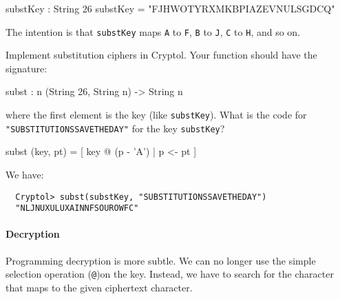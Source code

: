 \begin{code}
  substKey : String 26
  substKey = "FJHWOTYRXMKBPIAZEVNULSGDCQ"
\end{code}
The intention is that {\tt substKey} maps {\tt A} to {\tt F}, {\tt B}
to {\tt J}, {\tt C} to {\tt H}, and so on.

\begin{Exercise}\label{ex:subst:0}
  Implement substitution ciphers in Cryptol. Your function should have
  the signature:
\begin{code}
  subst : {n} (String 26, String n) -> String n
\end{code}
where the first element is the key (like {\tt substKey}).
What is the code for \\
{\tt "SUBSTITUTIONSSAVETHEDAY"} for the key {\tt substKey}?
\end{Exercise}
\begin{Answer}
\begin{code}
  subst (key, pt) = [ key @ (p - 'A') | p <- pt ]
\end{code}
We have:
\begin{Verbatim}
  Cryptol> subst(substKey, "SUBSTITUTIONSSAVETHEDAY")
  "NLJNUXULUXAINNFSOUROWFC"
\end{Verbatim}
\end{Answer}

\paragraph*{Decryption} Programming decryption is more subtle.  We can
no longer use the simple selection operation ({\tt @})\indIndex on the
key. Instead, we have to search for the character that maps to the
given ciphertext character.

